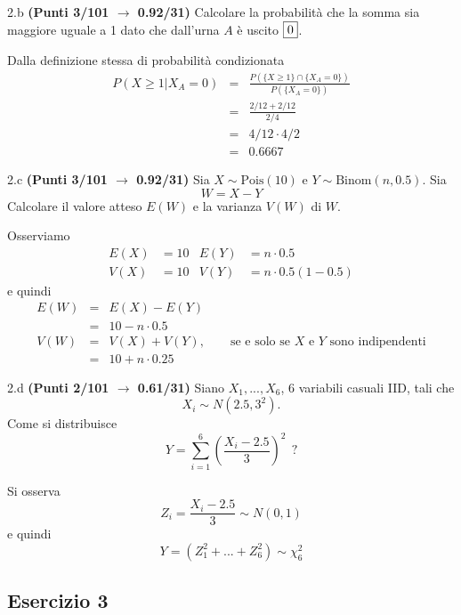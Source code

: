 \documentclass[
  11pt,
]{book}
\theoremstyle{mytheoremstyle}
\theoremstyle{mydefstyle}
\newenvironment{sol}
  {
  \begin{tcolorbox}[enhanced,breakable,arc=0.1mm,boxrule=1pt,colback=white,colframe=iblue,
  title=\bf \fontfamily{lmss}\selectfont \hspace{.5 cm} Soluzione,drop fuzzy shadow]

}{
\end{tcolorbox}
  }
\begin{document}
2.b \textbf{(Punti 3/101 \(\rightarrow\) 0.92/31)} Calcolare la probabilità che la somma sia maggiore uguale a 1 dato che dall'urna \(A\) è uscito \(\fbox{0}\).

\begin{sol}
Dalla definizione stessa di probabilità condizionata
\begin{eqnarray*}
P(X\geq 1|X_A=0)&=&\frac{P(\{X\geq 1\}\cap\{X_A=0\})}{P(\{X_A=0\})}\\
                &=&\frac{2/12+2/12}{2/4}\\
                &=&4/12\cdot4/2\\
                &=&0.6667
\end{eqnarray*}

\end{sol}

2.c \textbf{(Punti 3/101 \(\rightarrow\) 0.92/31)} Sia \(X\sim \text{Pois}(10)\) e \(Y\sim\text{Binom}(n,0.5)\).
Sia
\[
W=X-Y
\]
Calcolare il valore atteso \(E(W)\) e la varianza \(V(W)\) di \(W\).

\begin{sol}
Osserviamo
\begin{align*}
E(X)&=10 &E(Y)&=n\cdot 0.5\\
V(X)&=10 &V(Y)&=n\cdot0.5(1-0.5)
\end{align*}
e quindi
\begin{eqnarray*}
E(W)&=&E(X)-E(Y)\\
&=&10-n\cdot 0.5\\
V(W)&=&V(X)+V(Y),\qquad\text{se e solo se $X$ e $Y$ sono indipendenti}\\
&=&10+n\cdot 0.25
\end{eqnarray*}

\end{sol}

2.d \textbf{(Punti 2/101 \(\rightarrow\) 0.61/31)} Siano \(X_1,...,X_6\), \(6\) variabili casuali IID,
tali che
\[
X_i\sim N\left(2.5,3^2\right).
\]
Come si distribuisce
\[
Y=\sum_{i=1}^6\left(\frac{X_i-2.5}{3}\right)^2~~?
\]

\begin{sol}
Si osserva
\[
Z_i=\frac{X_i-2.5}{3}\sim N(0,1)
\]
e quindi
\[
Y=(Z_1^2+...+Z_6^2)\sim\chi_6^2
\]

\end{sol}

\subsection{Esercizio 3}\label{esercizio-3-5}
\end{document}
